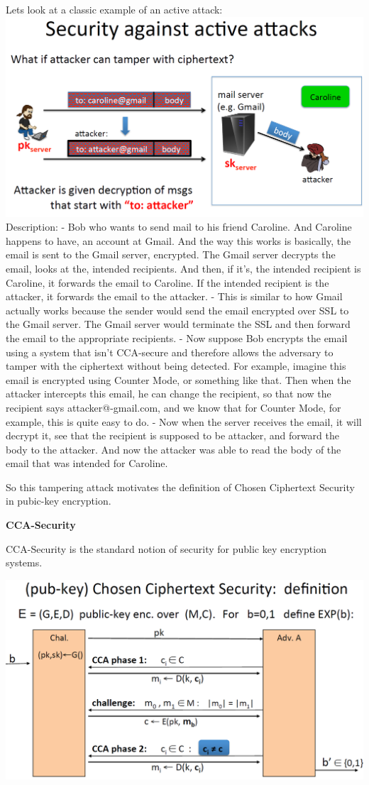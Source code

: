 \documentclass[11pt]{article}
\makeatletter
\def\maxwidth{\ifdim\Gin@nat@width>\linewidth\linewidth
    \else\Gin@nat@width\fi}
\let\Oldincludegraphics\includegraphics
\renewcommand{\includegraphics}[1]{\Oldincludegraphics[width=.8\maxwidth]{#1}}
\makeatother
\begin{document}
Lets look at a classic example of an active attack:
\includegraphics{./Images/PKEnc-SAA.png} Description: - Bob who wants to
send mail to his friend Caroline. And Caroline happens to have, an
account at Gmail. And the way this works is basically, the email is sent
to the Gmail server, encrypted. The Gmail server decrypts the email,
looks at the, intended recipients. And then, if it's, the intended
recipient is Caroline, it forwards the email to Caroline. If the
intended recipient is the attacker, it forwards the email to the
attacker. - This is similar to how Gmail actually works because the
sender would send the email encrypted over SSL to the Gmail server. The
Gmail server would terminate the SSL and then forward the email to the
appropriate recipients. - Now suppose Bob encrypts the email using a
system that isn't CCA-secure and therefore allows the adversary to
tamper with the ciphertext without being detected. For example, imagine
this email is encrypted using Counter Mode, or something like that. Then
when the attacker intercepts this email, he can change the recipient, so
that now the recipient says attacker@-gmail.com, and we know that for
Counter Mode, for example, this is quite easy to do. - Now when the
server receives the email, it will decrypt it, see that the recipient is
supposed to be attacker, and forward the body to the attacker. And now
the attacker was able to read the body of the email that was intended
for Caroline.

So this tampering attack motivates the definition of Chosen Ciphertext
Security in pubic-key encryption.

\textbf{CCA-Security}

CCA-Security is the standard notion of security for public key
encryption systems.

\includegraphics{./Images/PKEnc-CCASecurity.png}
\end{document}

